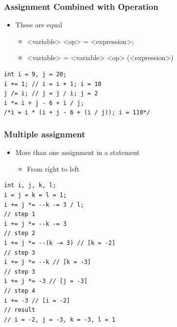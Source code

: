 \documentclass{../c-lecture}
\begin{document}
\begin{frame}[fragile]
  \frametitle{Assignment Combined with Operation}
  \begin{itemize}
    \item These are equal
    \begin{itemize}
      \item <variable> <op> = <expression>;
      \item
        <variable> = <variable> <op> (<expression>)
    \end{itemize}
  \end{itemize}
  \begin{verbatim}
int i = 9, j = 20;
i += 1; // i = i + 1; i = 10
j /= i; // j = j / i; j = 2
i *= i + j - 6 + i / j;
/*i = i * (i + j - 6 + (i / j)); i = 110*/
  \end{verbatim}
\end{frame}

\begin{frame}[fragile]
  \frametitle{Multiple assignment}
  \begin{itemize}
    \item More than one assignment in a statement
    \begin{itemize}
      \item From right to left
    \end{itemize}
  \end{itemize}
  \scriptsize
  \begin{verbatim}
int i, j, k, l;
i = j = k = l = 1;
i += j *= --k -= 3 / l;
// step 1
i += j *= --k -= 3
// step 2
i += j *= --(k -= 3) // [k = -2]
// step 3
i += j *= --k // [k = -3]
// step 3
i += j *= -3 // [j = -3]
// step 4
i += -3 // [i = -2]
// result
// i = -2, j = -3, k = -3, l = 1
  \end{verbatim}
\end{frame}
\end{document}
